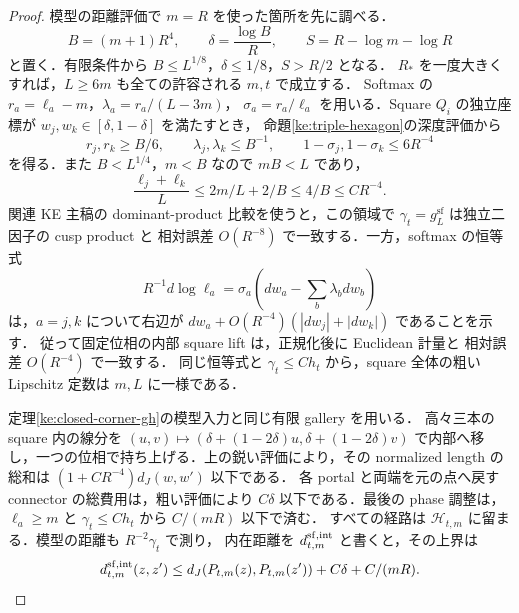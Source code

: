 \begin{proof}
模型の距離評価で $m=R$ を使った箇所を先に調べる．
\[
 B=(m+1)R^4,\qquad
 \delta=\frac{\log B}{R},\qquad
 S=R-\log m-\log R
\]
と置く．有限条件から $B\le L^{1/8}$，$\delta\le1/8$，$S>R/2$ となる．
$R_*$ を一度大きくすれば，$L\ge6m$ も全ての許容される $m,t$ で成立する．
Softmax の $r_a=\ell_a-m$，$\lambda_a=r_a/(L-3m)$，
$\sigma_a=r_a/\ell_a$ を用いる．Square $Q_i$ の独立座標が
$w_j,w_k\in[\delta,1-\delta]$ を満たすとき，
命題\ref{ke:triple-hexagon}の深度評価から
\[
 r_j,r_k\ge B/6,\qquad \lambda_j,\lambda_k\le B^{-1},\qquad
 1-\sigma_j,1-\sigma_k\le6R^{-4}
\]
を得る．また $B<L^{1/4}$，$m<B$ なので $mB<L$ であり，
\[
 \frac{\ell_j+\ell_k}{L}
 \le 2m/L+2/B\le4/B\le CR^{-4}.
\]
関連 KE 主稿の dominant-product 比較を使うと，この領域で
$\gamma_t=g_L^{\mathrm{sf}}$ は独立二因子の cusp product と
相対誤差 $O(R^{-8})$ で一致する．一方，softmax の恒等式
\[
 R^{-1}d\log\ell_a
 =\sigma_a\left(dw_a-\sum_b\lambda_bdw_b\right)
\]
は，$a=j,k$ について右辺が
$dw_a+O(R^{-4})(|dw_j|+|dw_k|)$ であることを示す．
従って固定位相の内部 square lift は，正規化後に Euclidean 計量と
相対誤差 $O(R^{-4})$ で一致する．
同じ恒等式と $\gamma_t\le Ch_t$ から，square 全体の粗い Lipschitz 定数は
$m,L$ に一様である．

定理\ref{ke:closed-corner-gh}の模型入力と同じ有限 gallery を用いる．
高々三本の square 内の線分を
$(u,v)\mapsto(\delta+(1-2\delta)u,\delta+(1-2\delta)v)$
で内部へ移し，一つの位相で持ち上げる．上の鋭い評価により，その normalized
length の総和は $(1+CR^{-4})d_J(w,w')$ 以下である．
各 portal と両端を元の点へ戻す connector の総費用は，粗い評価により
$C\delta$ 以下である．最後の phase 調整は，$\ell_a\ge m$ と
$\gamma_t\le Ch_t$ から $C/(mR)$ 以下で済む．
すべての経路は $\mathcal H_{t,m}$ に留まる．模型の距離も $R^{-2}\gamma_t$ で測り，
内在距離を $d_{t,m}^{\rm sf,int}$ と書くと，その上界は
\begin{equation}\label{ke:eq:slow-cut-model-upper}
 d_{t,m}^{\rm sf,int}(z,z')
 \le d_J(P_{t,m}(z),P_{t,m}(z'))+C\delta+C/(mR).
\end{equation}


\end{proof}
